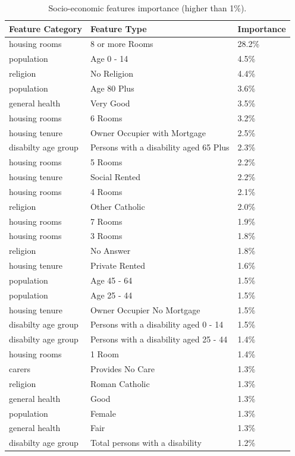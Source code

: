 \documentclass[conference,final,]{IEEEtran}
\begin{document}
\begin{table}

\caption{\label{tab:census-features-table}Socio-economic features importance (higher than 1\%).}
\centering
\fontsize{8}{10}\selectfont
\begin{tabular}[t]{lll}
\toprule
Feature Category & Feature Type & Importance\\
\midrule
housing rooms & 8 or more Rooms & 28.2\%\\
population & Age 0 - 14 & 4.5\%\\
religion & No Religion & 4.4\%\\
population & Age 80 Plus & 3.6\%\\
general health & Very Good & 3.5\%\\
housing rooms & 6 Rooms & 3.2\%\\
housing tenure & Owner Occupier with Mortgage & 2.5\%\\
disabilty age group & Persons with a disability aged 65 Plus & 2.3\%\\
housing rooms & 5 Rooms & 2.2\%\\
housing tenure & Social Rented & 2.2\%\\
housing rooms & 4 Rooms & 2.1\%\\
religion & Other Catholic & 2.0\%\\
housing rooms & 7 Rooms & 1.9\%\\
housing rooms & 3 Rooms & 1.8\%\\
religion & No Answer & 1.8\%\\
housing tenure & Private Rented & 1.6\%\\
population & Age 45 - 64 & 1.5\%\\
population & Age 25 - 44 & 1.5\%\\
housing tenure & Owner Occupier No Mortgage & 1.5\%\\
disabilty age group & Persons with a disability aged 0 - 14 & 1.5\%\\
disabilty age group & Persons with a disability aged 25 - 44 & 1.4\%\\
housing rooms & 1 Room & 1.4\%\\
carers & Provides No Care & 1.3\%\\
religion & Roman Catholic & 1.3\%\\
general health & Good & 1.3\%\\
population & Female & 1.3\%\\
general health & Fair & 1.3\%\\
disabilty age group & Total persons with a disability & 1.2\%\\

\end{tabular}
\end{table}
\end{document}
